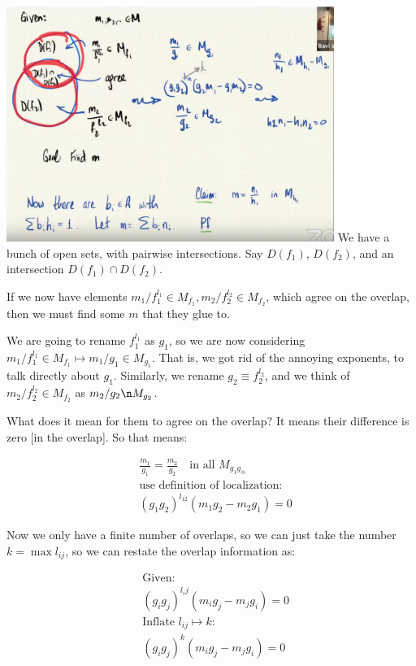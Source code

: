 \documentclass{book}
\theoremstyle{definition}
\begin{document}
\includegraphics[width=0.8\textwidth]{./pseudolecture-8-gluing.png}
We have a bunch of open sets, with pairwise intersections. Say $D(f_1)$, $D(f_2)$,
and an intersection $D(f_1) \cap D(f_2)$.

If we now have elements $m_1 / f_1^{l_1} \in M_{f_1}, m_2/f_2^{l_2} \in M_{f_2}$,
which agree on the overlap, then we must find some $m$ that they glue to.


We are going to rename $f_1^{l_1}$ as $g_1$, so we are now considering 
$m_1/f_1^{l_1} \in M_{f_1} \mapsto m_1/g_1 \in M_{g_1}$. That is, we got
rid of the annoying exponents, to talk directly about $g_1$. Similarly,
we rename $g_2 \equiv f_2^{l_2}$, and we think of $m_2/f_2^{l_2} \in M_{f_2}$
as $m_2/g_2 \n M_{g_2}$.

What does it mean for them to agree on the overlap? It means their difference
is zero [in the overlap]. So that means:

\begin{align*}
&\frac{m_1}{g_1} = \frac{m_2}{g_2} \quad \text{in all $M_{g_1 g_@}$} \\
&\text{use definition of localization:} \\
&(g_1g_2)^{l_12} (m_1 g_2 - m_2 g_1) = 0 
\end{align*}

Now we only have a finite number of overlaps, so we can just take the number
$k = \max l_{ij}$, so we can restate the overlap information as:


\begin{align*}
&\text{Given:} \\
&(g_ig_j)^{l_ij} (m_i g_j - m_j g_i) = 0  \\
&\text{Inflate $l_{ij} \mapsto k$:} \\
&(g_ig_j)^k (m_i g_j - m_j g_i) = 0  \\
\end{align*}
\end{document}
